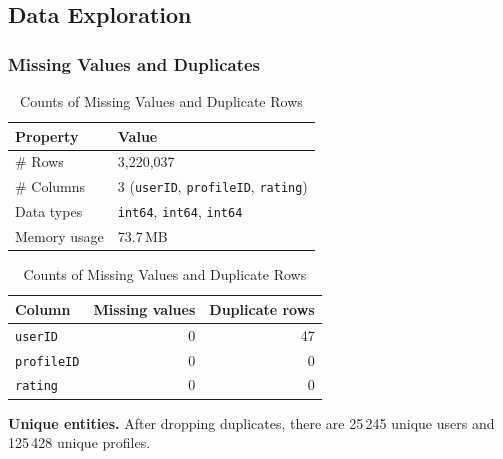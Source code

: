 \subsection*{Data Exploration}

\subsubsection*{Missing Values and Duplicates}
\begin{table}[H]
  \centering
  \begin{minipage}{0.48\textwidth}
    \centering
    \caption{Structure of the Ratings DataFrame}
    \label{tab:df-overview}
    \begin{tabular}{@{}ll@{}}
      \toprule
      Property      & Value                                             \\ 
      \midrule
      \# Rows       & 3{,}220{,}037                                     \\
      \# Columns    & 3 (\texttt{userID}, \texttt{profileID}, \texttt{rating})    \\
      Data types    & \texttt{int64}, \texttt{int64}, \texttt{int64}   \\
      Memory usage  & 73.7\,MB                                          \\
      \bottomrule
    \end{tabular}
  \end{minipage}%
  \hfill
  \begin{minipage}{0.48\textwidth}
    \centering
    \caption{Counts of Missing Values and Duplicate Rows}
    \label{tab:missing-dup}
    \begin{tabular}{@{}lrr@{}}
      \toprule
      Column         & Missing values & Duplicate rows \\ 
      \midrule
      \texttt{userID}    & 0              & 47                \\
      \texttt{profileID} & 0              & 0                 \\
      \texttt{rating}    & 0              & 0                 \\
      \bottomrule
    \end{tabular}
  \end{minipage}
\end{table}

\noindent\textbf{Unique entities.} After dropping duplicates, there are 25\,245 unique users and 125\,428 unique profiles.

